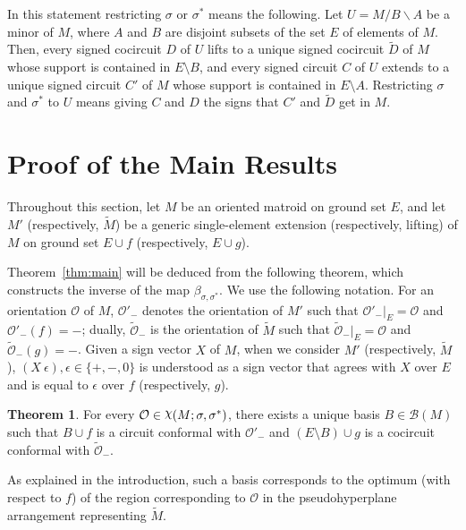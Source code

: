 \documentclass[12pt]{amsart}
\numberwithin{equation}{section}
\theoremstyle{definition}
\newtheorem{theorem}{Theorem}[section]
\newcommand{\Bcal}{{\mathcal B}}
\newcommand{\Ocal}{{\mathcal O}}
\DeclareRobustCommand{\rchi}{{\mathpalette\irchi\relax}}
\newcommand{\irchi}[2]{\raisebox{\depth}{$#1\chi$}}
\newcommand{\paco}[1]{\todo[color=orange!30]{\footnotesize \rm #1 \\ \hfill --- P.}}
\begin{document}
In this statement restricting $\sigma$ or $\sigma^*$ means the following. Let $U= M/B\backslash A$ be a minor of $M$, where $A$ and $B$ are disjoint subsets of the set $E$ of elements of $M$. Then, every signed cocircuit $D$ of $U$ lifts to a unique signed cocircuit $\widetilde D$ of $M$ whose support is contained in $E\setminus B$, and every signed circuit $C$ of $U$ extends to a unique signed circuit $ C'$ of $M$ whose support is contained in $E\setminus A$. Restricting $\sigma$ and $\sigma^*$ to $U$ means giving $C$ and $D$ the signs that $C'$ and $\widetilde D$ get in $M$.



\section{Proof of the Main Results} \label{sec:main}

Throughout this section, let $M$ be an oriented matroid on ground set $E$, and let $M'$ (respectively, $\widetilde{M}$)  be a generic single-element extension (respectively, lifting) of $M$ on ground set $E\cup f$ (respectively, $E\cup g$).

Theorem~\ref{thm:main} will be deduced from the following theorem, which constructs the inverse of the map $\beta_{\sigma,\sigma^*}$.
We use the following notation.
For an orientation $\Ocal$ of $M$, $\Ocal'_-$ denotes the orientation of $M'$ such that $\Ocal'_-|_E=\Ocal$ and $\Ocal'_-(f)=-$; dually, $\widetilde{\Ocal}_-$ is the orientation of $\widetilde{M}$ such that $\widetilde{\Ocal}_-|_E=\Ocal$ and $\widetilde{\Ocal}_-(g)=-$.
Given a sign vector $X$ of $M$, when we consider $M'$ (respectively, $\widetilde{M}$), $(X\ \epsilon), \epsilon\in\{+,-,0\}$ is understood as a sign vector that agrees with $X$ over $E$ and is equal to $\epsilon$ over $f$ (respectively, $g$).


\begin{theorem} \label{thm:main_actual}
For every $\Ocal\in\rchi(M;\sigma,\sigma^*)$, there exists a unique basis $B\in\Bcal(M)$ such that $B\cup f$ is a circuit conformal with $\Ocal'_-$ and $(E\setminus B)\cup g$ is a cocircuit conformal with $\widetilde{\Ocal}_-$.
\end{theorem}

As explained in the introduction, such a basis corresponds to the optimum (with respect to $f$) of the region corresponding to $\Ocal$ in the pseudohyperplane arrangement representing $\widetilde M$.
\end{document}
